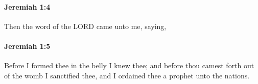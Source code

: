 		\paragraph{Jeremiah 1:4} %
			\label{JEREMIAH-1-4}

			Then the word of the LORD came unto me, saying,


		\paragraph{Jeremiah 1:5} %
			\label{JEREMIAH-1-5}

			Before I formed thee in the belly I knew thee; and before thou camest forth out of the womb I sanctified thee, and I ordained thee a prophet unto the nations.


